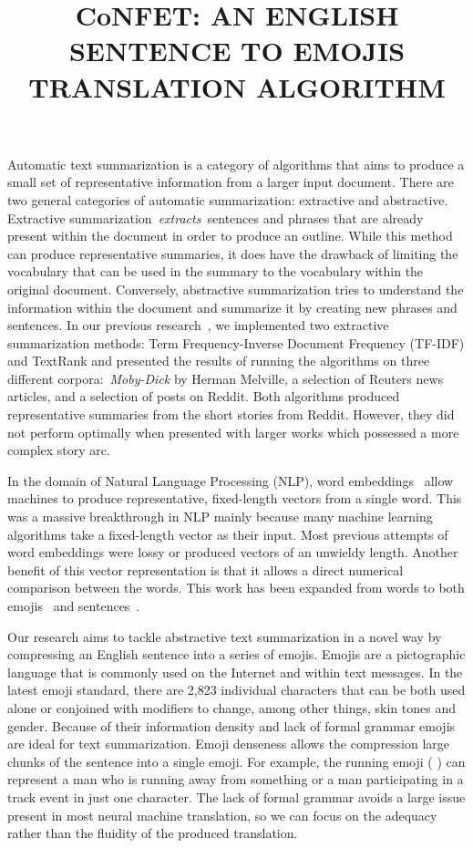 \documentclass{article}[10]
\newcommand*{\img}[1]{%
  \raisebox{-.3\baselineskip}{%
    \texttt{[image: \#1]}%
  }%
} \title{{CoNFET:} AN ENGLISH SENTENCE TO EMOJIS TRANSLATION ALGORITHM}
\begin{document}
Automatic text summarization is a category of algorithms that aims to produce a
small set of representative information from a larger input document. There are
two general categories of automatic summarization: extractive and abstractive.
Extractive summarization~\emph{extracts~}sentences and phrases that are already
present within the document in order to produce an outline. While this method
can produce representative summaries, it does have the drawback of limiting the
vocabulary that can be used in the summary to the vocabulary within the original
document. Conversely, abstractive summarization tries to understand the
information within the document and summarize it by creating new phrases and
sentences. In our previous research~\cite{day_extractive}, we implemented two
extractive summarization methods: Term Frequency-Inverse Document Frequency
(TF-IDF) and TextRank and presented the results of running the algorithms on
three different corpora:~\emph{Moby-Dick} by Herman Melville, a selection of
Reuters news articles, and a selection of posts on Reddit. Both algorithms
produced representative summaries from the short stories from Reddit. However,
they did not perform optimally when presented with larger works which possessed
a more complex story arc.

In the domain of Natural Language Processing (NLP), word
embeddings~\cite{mikolov2013efficient} allow machines to produce representative,
 fixed-length vectors from a single word. This was a massive breakthrough in NLP
mainly because many machine learning algorithms take a fixed-length vector as
their input. Most previous attempts of word embeddings were lossy or produced
vectors of an unwieldy length. Another benefit of this vector representation is
that it allows a direct numerical comparison between the words. This work has
been expanded from words to both emojis~\cite{Eisner_2016} and
sentences~\cite{pg2017unsu}.

Our research aims to tackle abstractive text summarization in a novel way by
compressing an English sentence into a series of emojis. Emojis are a
pictographic language that is commonly used on the Internet and within text
messages. In the latest emoji standard, there are 2,823 individual characters
that can be both used alone or conjoined with modifiers to change, among other
things, skin tones and gender. Because of their information density and lack of
formal grammar emojis are ideal for text summarization. Emoji denseness allows the compression large chunks of
the sentence into a single emoji. For example, the running emoji
(\img{emojis/1f3c3.png}) can represent a man who is running away from something
or a man participating in a track event in just one character. The lack of
formal grammar avoids a large issue present in most neural machine
translation, so we can focus on the adequacy rather than the fluidity of the
produced translation.
\end{document}
